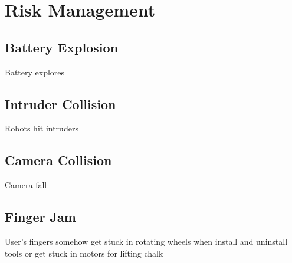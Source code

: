 
\section{Risk Management}
\label{sec:risk}

\subsection{Battery Explosion}
Battery explores

\subsection{Intruder Collision}
Robots hit intruders

\subsection{Camera Collision}
Camera fall

\subsection{Finger Jam}
User's fingers somehow get stuck in rotating wheels when install and uninstall tools or get stuck in motors for lifting chalk
